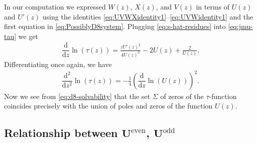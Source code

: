 \documentclass[pdftex]{sigma}
\numberwithin{equation}{section}
\begin{document}
In our computation we expressed $W(z)$, $X(z)$, and $V(z)$ in terms of $U(z)$ and $U'(z)$ using the identities \eqref{eq:UVWXidentity1}--\eqref{eq:UVWidentity1} and the first equation in \eqref{eq:PossiblyD8system}. Plugging \eqref{eq:s-hat-residues} into \eqref{eq:jmu-tau} we get
\begin{gather*}
\dfrac{\mathrm{d}}{\mathrm{d}z}\ln(\tau(z))=\frac{zU'(z)^2}{4U(z)^2}-
 2 U(z)+\frac2{U(z)}.
\end{gather*}
Differentiating once again, we have
\begin{gather} \label{eq:d8-solvability}
\dfrac{\mathrm{d}^2}{\mathrm{d}z^2}\ln(\tau(z))=-\frac{1}{4}\left(\dfrac{\mathrm{d}}{\mathrm{d}z}\ln(U(z))\right)^2.
\end{gather}
 Now we see from \eqref{eq:d8-solvability} that the set $\Sigma$ of zeros of the $\tau$-function coincides precisely with the union of poles and zeros of the function $U(z)$.

\subsection[Relationship between U\^{}\{even\}, U\^{}\{odd\}]{Relationship between $\boldsymbol{U^{\mathrm{even}}}$, $\boldsymbol{U^{\mathrm{odd}}}$}
\end{document}
